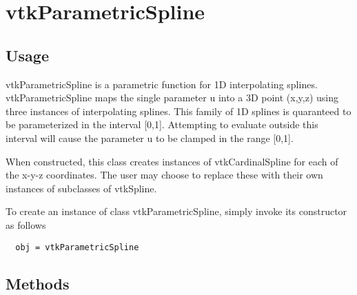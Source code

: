 \section{vtkParametricSpline}

\subsection{Usage}

 vtkParametricSpline is a parametric function for 1D interpolating splines.
 vtkParametricSpline maps the single parameter u into a 3D point (x,y,z)
 using three instances of interpolating splines.  This family of 1D splines
 is quaranteed to be parameterized in the interval [0,1].  Attempting to
 evaluate outside this interval will cause the parameter u to be clamped in
 the range [0,1].

 When constructed, this class creates instances of vtkCardinalSpline for
 each of the x-y-z coordinates. The user may choose to replace these with
 their own instances of subclasses of vtkSpline.


To create an instance of class vtkParametricSpline, simply
invoke its constructor as follows
\begin{verbatim}
  obj = vtkParametricSpline
\end{verbatim}
\subsection{Methods}

